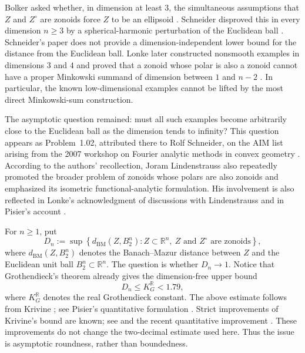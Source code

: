 \documentclass[11pt]{article}
\theoremstyle{definition}
\theoremstyle{remark}
\newcommand{\R}{\mathbb R}
\newcommand{\BM}{\mathrm{BM}}
\begin{document}
Bolker asked whether, in dimension at least $3$, the simultaneous
assumptions that $Z$ and $Z^\circ$ are zonoids force $Z$ to be an ellipsoid
\cite[Conjecture~6.8]{Bolker1969}.  Schneider disproved this in every
dimension $n\geq3$ by a spherical-harmonic perturbation of
the Euclidean ball \cite{Schneider1975}.  Schneider's paper does not
provide a dimension-independent lower bound for the distance from the
Euclidean ball.  Lonke later constructed nonsmooth examples in
dimensions $3$ and $4$ and proved that a zonoid whose polar is also a zonoid cannot have a proper
Minkowski summand of dimension between $1$ and $n-2$
\cite{Lonke1997}.  In particular, the known low-dimensional examples
cannot be lifted by the most direct Minkowski-sum construction.

The asymptotic question remained: must all such examples become
arbitrarily close to the Euclidean ball as the dimension tends to
infinity?  This question appears as Problem~1.02, attributed there to
Rolf Schneider, on the AIM list arising from the 2007 workshop on
Fourier analytic methods in convex geometry \cite{AIM2007}.  According
to the authors' recollection, Joram Lindenstrauss also repeatedly
promoted the broader problem of zonoids whose polars are also zonoids and emphasized its isometric
functional-analytic formulation.  His involvement is also reflected
in Lonke's acknowledgment of discussions with Lindenstrauss
\cite[p.~12]{Lonke1997} and in Pisier's account
\cite[discussion following Corollary~2.7]{Pisier2012}.

For $n\geq1$, put
\begin{equation}\label{eq:Dn-definition}
 D_n:=\sup\left\{
 d_{\BM}(Z,B_2^n):
 Z\subset\R^n,\ Z\text{ and }Z^\circ\text{ are zonoids}
 \right\},
\end{equation}
where $d_{\BM}(Z,B_2^n)$ denotes the Banach--Mazur distance between $Z$ and the Euclidean unit ball $B_2^n\subset\R^n$.
  The question is whether $D_n\to1$.  Notice that Grothendieck's theorem
already gives the dimension-free upper bound
\begin{equation}\label{eq:Grothendieck-upper}
 D_n\leq K_G^{\R}<1.79,
\end{equation}
where $K_G^{\R}$ denotes the real Grothendieck constant. The above estimate follows from Krivine
\cite{Krivine1979}; see Pisier's quantitative formulation
\cite[Corollary~2.7]{Pisier2012}.  Strict improvements of Krivine's
bound are known; see \cite{BravermanMakarychevMakarychevNaor2011} and
the recent quantitative improvement \cite{SahaEtAl2026}.  These
improvements do not change the two-decimal estimate used here.
Thus the issue is asymptotic
roundness, rather than boundedness.
\end{document}
